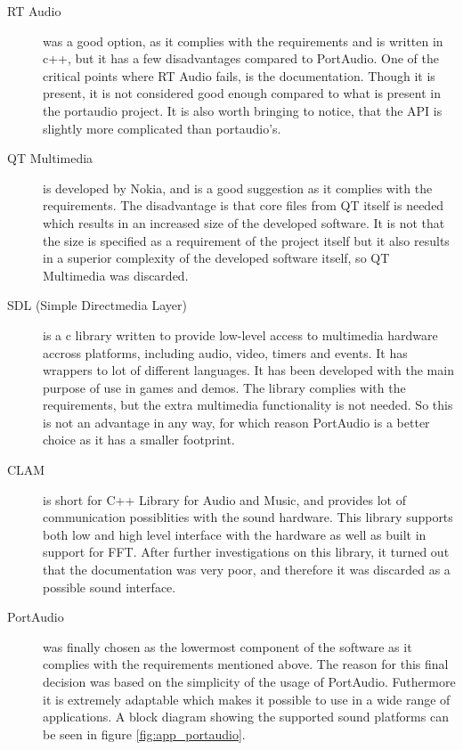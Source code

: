\begin{description}
\item[RT Audio\footnotemark] was a good option, as it complies with the requirements and is written in c++, but it has a few disadvantages compared to PortAudio. One of the critical points where RT Audio fails, is the documentation. Though it is present, it is not considered good enough compared to what is present in the portaudio project. It is also worth bringing to notice, that the API is slightly more complicated than portaudio's.

\item[QT Multimedia\footnotemark] is developed by Nokia, and is a good suggestion as it complies with the requirements. The disadvantage is that core files from QT itself is needed which results in an increased size of the developed software. It is not that the size is specified as a requirement of the project itself but it also results in a superior complexity of the developed software itself, so QT Multimedia was discarded.

\item[SDL (Simple Directmedia Layer)\footnotemark]
 is a c library written to provide low-level access to multimedia hardware accross platforms, including audio, video, timers and events. It has wrappers to lot of different languages. It has been developed with the main purpose of use in games and demos. The library complies with the requirements, but the extra multimedia functionality is not needed. So this is not an advantage in any way, for which reason PortAudio is a better choice as it has a smaller footprint.

\item[CLAM\footnotemark] is short for C++ Library for Audio and Music, and provides lot of communication possiblities with the sound hardware. This library supports both low and high level interface with the hardware as well as built in support for FFT. After further investigations on this library, it turned out that the documentation was very poor, and therefore it was discarded as a possible sound interface.

\item[PortAudio\footnotemark] was finally chosen as the lowermost component of the software as it complies with the requirements mentioned above.  The reason for this final decision was based on the simplicity of the usage of PortAudio. Futhermore it is extremely adaptable which makes it possible to use in a wide range of applications. A block diagram showing the supported sound platforms can be seen in figure \ref{fig:app_portaudio}.
\end{description}

